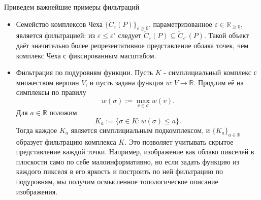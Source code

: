 \begin{examples}
Приведем важнейшие примеры фильтраций
\begin{itemize}
\item Семейство комплексов Чеха $\{\check{C}_{\varepsilon}(P)\}_{\varepsilon \ge 0}$, параметризованное $\varepsilon \in \mathbb{R}_{\ge 0}$, является фильтрацией: из $\varepsilon \le \varepsilon'$ следует $\check{C}_{\varepsilon}(P)\subseteq \check{C}_{\varepsilon'}(P)$.
Такой объект даёт значительно более репрезентативное представление облака точек, чем комплекс Чеха с фиксированным масштабом.

\item Фильтрация по подуровням функции.
Пусть $K$ - симплициальный комплекс с множеством вершин $V$, и пусть задана функция $w:V\to\mathbb{R}$.
Продлим её на симплексы по правилу
\[
w(\sigma) := \max_{v\in\sigma} w(v).
\]
Для $a\in\mathbb{R}$ положим
\[
K_a := \{\sigma\in K : w(\sigma)\le a\}.
\]
Тогда каждое $K_a$ является симплициальным подкомплексом, и $\{K_a\}_{a\in\mathbb{R}}$ образует фильтрацию комплекса $K$. Это позволяет учитывать скрытое представление каждой точки. Например, изображение как облако пикселей в плоскости само по себе малоинформативно, но если задать функцию из каждого пикселя в его яркость и построить по ней фильтрацию по подуровням, мы получим осмысленное топологическое описание изображения.
\end{itemize}
\end{examples}


